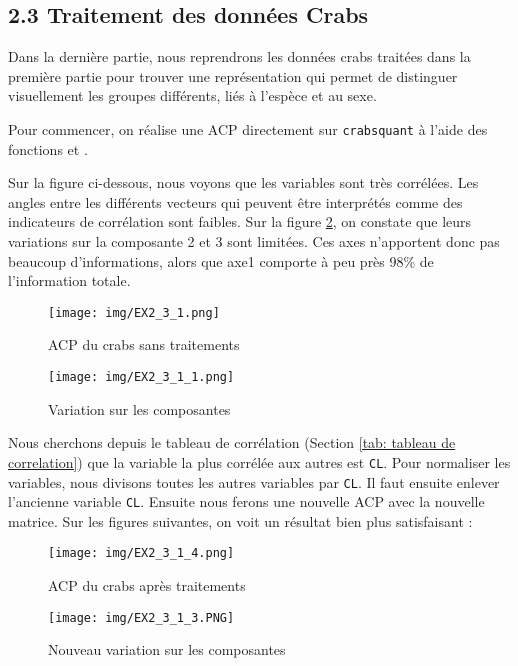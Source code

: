 \documentclass{article}
\begin{document}
\begin{multicols}{2}
	\subsection*{2.3 Traitement des données Crabs}
	Dans la dernière partie, nous reprendrons les données crabs traitées dans la première partie pour trouver une représentation qui permet de distinguer visuellement les groupes différents, liés à l'espèce et au sexe.
	
	Pour commencer, on réalise une ACP directement sur \verb|crabsquant| à l'aide des fonctions et .
	
	Sur la figure ci-dessous, nous voyons que les variables sont très corrélées. Les angles entre les différents vecteurs qui peuvent être interprétés comme des indicateurs de corrélation sont faibles. Sur la figure \ref{fig:9}, on constate que leurs variations sur la composante 2 et 3 sont limitées. Ces axes n’apportent donc pas beaucoup d’informations, alors que axe1 comporte à peu près 98\% de l’information totale.

	\begin{figure}[H]
		\centering
		\texttt{[image: img/EX2\_3\_1.png]}
		\caption{ACP du crabs sans traitements}
		\label{fig:8 }
	\end{figure}
	
	\begin{figure}[H]
		\centering
		\texttt{[image: img/EX2\_3\_1\_1.png]}
		\caption{Variation sur les composantes}
		\label{fig:9}
	\end{figure}
	
	 Nous cherchons depuis le tableau de corrélation (Section \ref{tab: tableau de correlation}) que la variable la plus corrélée aux autres est \verb|CL|. Pour normaliser les variables, nous divisons toutes les autres variables par \verb|CL|. Il faut ensuite enlever l’ancienne variable \verb|CL|. Ensuite nous ferons une nouvelle ACP avec la nouvelle matrice. Sur les figures suivantes, on voit un résultat bien plus satisfaisant :

	\begin{figure}[H]
		\centering
		\texttt{[image: img/EX2\_3\_1\_4.png]}
		\caption{ACP du crabs après traitements}
		\label{fig:10 }
	\end{figure}
	
	\begin{figure}[H]
		\centering
		\texttt{[image: img/EX2\_3\_1\_3.PNG]}
		\caption{Nouveau variation sur les composantes}
		\label{fig:11}
	\end{figure}




\end{multicols}
\end{document}
